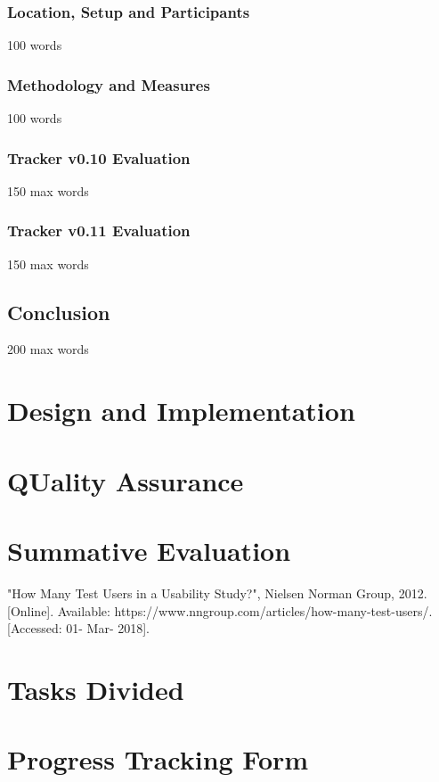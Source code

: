 \documentclass[12pt,a4paper]{article}
\begin{document}
        \subsubsection{Location, Setup and Participants}
          100 words
        \subsubsection{Methodology and Measures}
          100 words
        \subsubsection{Tracker v0.10 Evaluation}
          150 max words
        \subsubsection{Tracker v0.11 Evaluation}
          150 max words
      \subsection{Conclusion}
        200 max words
      \newpage
    \section{Design and Implementation}
    \section{QUality Assurance}
    \section{Summative Evaluation}
    
    \begin{thebibliography}{20}
       "How Many Test Users in a Usability Study?", Nielsen Norman Group, 2012. [Online]. Available: https://www.nngroup.com/articles/how-many-test-users/. [Accessed: 01- Mar- 2018].
    \end{thebibliography}
    
    \begin{appendices}
      \section{Tasks Divided}
        \paragraph{}
      \section{Progress Tracking Form}

    \end{appendices}

  
\end{document}
